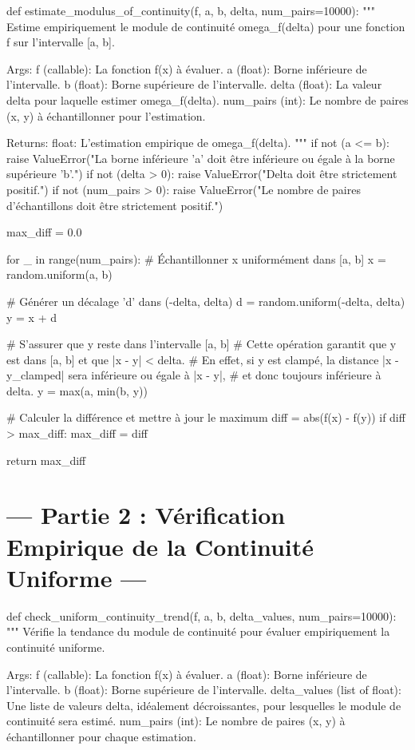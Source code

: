 \documentclass[12pt,a4paper]{report}
\begin{document}
def estimate\_modulus\_of\_continuity(f, a, b, delta, num\_pairs=10000):
    """
    Estime empiriquement le module de continuité omega\_f(delta) pour une fonction f
    sur l'intervalle [a, b].

    Args:
        f (callable): La fonction f(x) à évaluer.
        a (float): Borne inférieure de l'intervalle.
        b (float): Borne supérieure de l'intervalle.
        delta (float): La valeur delta pour laquelle estimer omega\_f(delta).
        num\_pairs (int): Le nombre de paires (x, y) à échantillonner pour l'estimation.

    Returns:
        float: L'estimation empirique de omega\_f(delta).
    """
    if not (a <= b):
        raise ValueError("La borne inférieure 'a' doit être inférieure ou égale à la borne supérieure 'b'.")
    if not (delta > 0):
        raise ValueError("Delta doit être strictement positif.")
    if not (num\_pairs > 0):
        raise ValueError("Le nombre de paires d'échantillons doit être strictement positif.")

    max\_diff = 0.0

    for \_ in range(num\_pairs):
        \# Échantillonner x uniformément dans [a, b]
        x = random.uniform(a, b)

        \# Générer un décalage 'd' dans (-delta, delta)
        d = random.uniform(-delta, delta)
        y = x + d

        \# S'assurer que y reste dans l'intervalle [a, b]
        \# Cette opération garantit que y est dans [a, b] et que |x - y| < delta.
        \# En effet, si y est clampé, la distance |x - y\_clamped| sera inférieure ou égale à |x - y|,
        \# et donc toujours inférieure à delta.
        y = max(a, min(b, y))

        \# Calculer la différence et mettre à jour le maximum
        diff = abs(f(x) - f(y))
        if diff > max\_diff:
            max\_diff = diff

    return max\_diff

\section{--- Partie 2 : Vérification Empirique de la Continuité Uniforme ---}

def check\_uniform\_continuity\_trend(f, a, b, delta\_values, num\_pairs=10000):
    """
    Vérifie la tendance du module de continuité pour évaluer empiriquement
    la continuité uniforme.

    Args:
        f (callable): La fonction f(x) à évaluer.
        a (float): Borne inférieure de l'intervalle.
        b (float): Borne supérieure de l'intervalle.
        delta\_values (list of float): Une liste de valeurs delta, idéalement décroissantes,
                                      pour lesquelles le module de continuité sera estimé.
        num\_pairs (int): Le nombre de paires (x, y) à échantillonner pour chaque estimation.
\end{document}
